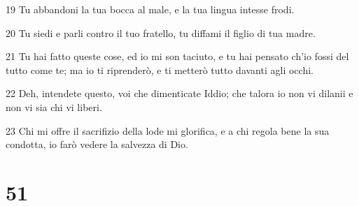 \par 19 Tu abbandoni la tua bocca al male, e la tua lingua intesse frodi.
\par 20 Tu siedi e parli contro il tuo fratello, tu diffami il figlio di tua madre.
\par 21 Tu hai fatto queste cose, ed io mi son taciuto, e tu hai pensato ch'io fossi del tutto come te; ma io ti riprenderò, e ti metterò tutto davanti agli occhi.
\par 22 Deh, intendete questo, voi che dimenticate Iddio; che talora io non vi dilanii e non vi sia chi vi liberi.
\par 23 Chi mi offre il sacrifizio della lode mi glorifica, e a chi regola bene la sua condotta, io farò vedere la salvezza di Dio.

\chapter{51}

